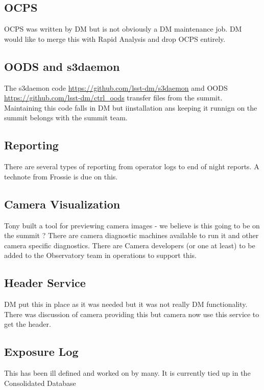 \subsection{ \gls{OCPS} }
\gls{OCPS}   was  written by \gls{DM} but is  not obviously a \gls{DM} maintenance job.
DM would like to merge this with Rapid Analysis and drop OCPS entirely.

\subsection{ OODS and s3daemon }
The s3daemon code \url{https://github.com/lsst-dm/s3daemon} amd OODS \url{https://github.com/lsst-dm/ctrl_oods}
transfer files from the summit.
Maintaining this code  falls in DM but iinstallation ans keeping it runnign on the summit belongs with the summit team.

\subsection{ Reporting }

There are several types of reporting from operator logs to end of night reports.
A technote from Frossie is due on this.

\subsection{ \gls{Camera} Visualization}
Tony built a tool for previewing camera images - we believe is this going to be on the summit ?
There are camera diagnostic machines available to run it and other camera specific diagnostics.
There are Camera developers (or one at least) to be added to the Observatory team in operations to support this.


\subsection{ Header Service }
 \gls{DM} put this in place as it was  needed but it was not really \gls{DM} functionality.
There was discussion of camera providing this but camera now use this service to get the header.

\subsection{ Exposure Log}
This has been ill defined and worked on by many.
It is currently tied up in the Consolidated Database 

